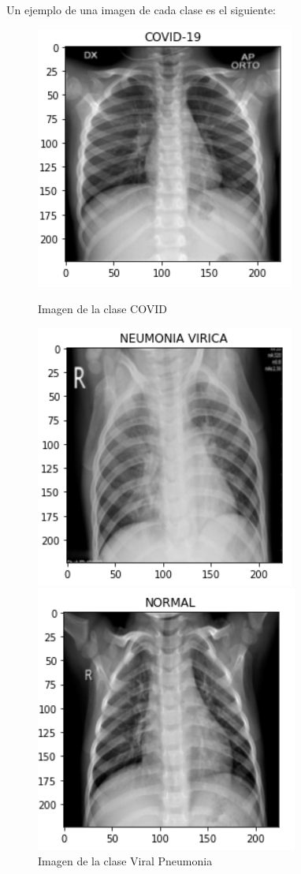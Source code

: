 \documentclass[11pt,a4paper]{article}
\theoremstyle{definition}
\begin{document}
Un ejemplo de una imagen de cada clase es el siguiente:

\begin{figure}[H]
  \centering
  \begin{minipage}[b]{0.25\textwidth}
    \includegraphics[scale=0.65]{./images/ejemploCOVID}
	\caption{Imagen de la clase COVID}
  \end{minipage}
  \hfill
  \begin{minipage}[b]{0.25\textwidth}
    \includegraphics[scale=0.65]{./images/ejemploNEUMONIAVIRICA}
	\caption{Imagen de la clase Viral Pneumonia}
  \end{minipage}
    \hfill
    \begin{minipage}[b]{0.25\textwidth}
    \includegraphics[scale=0.65]{./images/ejemploNORMAL}

\end{minipage}
\end{figure}
\end{document}
